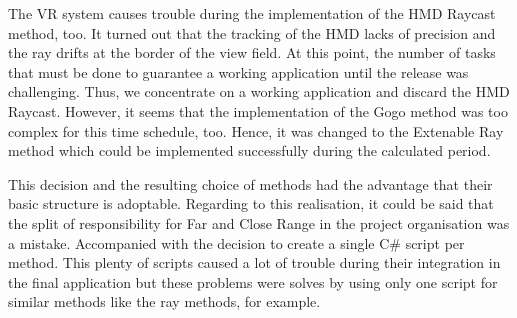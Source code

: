 The VR system causes trouble during the implementation of the HMD Raycast method, too. It turned out that the tracking of the HMD lacks of precision and the ray drifts at the border of the view field. At this point, the number of tasks that must be done to guarantee a working application until the release was challenging. Thus, we concentrate on a working application and discard the HMD Raycast. However, it seems that the implementation of the Gogo method was too complex for this time schedule, too. Hence, it was changed to the Extenable Ray method which could be implemented successfully during the calculated period. 

This decision and the resulting choice of methods had the advantage that their basic structure is adoptable. Regarding to this realisation, it could be said that the split of responsibility for Far and Close Range in the project organisation was a mistake. Accompanied with the decision to create a single C\# script per method. This plenty of scripts caused a lot of trouble during their integration in the final application but these problems were solves by using only one script for similar methods like the ray methods, for example.

\newpage

























